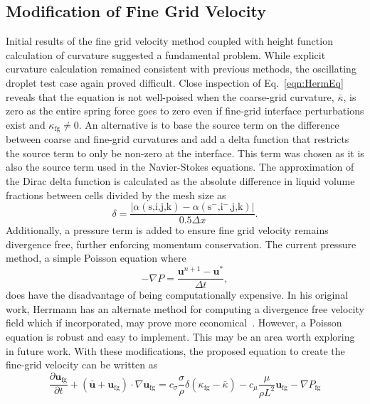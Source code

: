\subsection{Modification of Fine Grid Velocity}
Initial results of the fine grid velocity method coupled with height function calculation of curvature suggested a fundamental problem. While explicit curvature calculation remained consistent with previous methods, the oscillating droplet test case again proved difficult. Close inspection of Eq.~\ref{eqn:HermEq} reveals that the equation is not well-poised when the coarse-grid curvature, $\bar{\kappa}$, is zero as the entire spring force goes to zero even if fine-grid interface perturbations exist and $\kappa_{\text{fg}} \neq 0$.  An alternative is to base the source term on the difference between coarse and fine-grid curvatures and add a delta function that restricts the source term to only be non-zero at the interface. This term was chosen as it is also the source term used in the Navier-Stokes equations. The approximation of the Dirac delta function is calculated as the absolute difference in liquid volume fractions between cells divided by the mesh size as
\begin{equation}
\delta = \frac{|\alpha(\text{s,i,j,k}) - \alpha(\text{s$^-$,i$^-$,j,k}) | }{0.5 \Delta x}.
\label{eqn:delta}
\end{equation}
Additionally, a pressure term is added to ensure fine grid velocity remains divergence free, further enforcing momentum conservation. The current pressure method, a simple Poisson equation where 
\begin{equation}
-\nabla P = \frac{\bm{u}^{n+1} - \bm{u}^*}{\Delta t},
\label{eqn:poisson}
\end{equation}does have the disadvantage of being computationally expensive. In his original work, Herrmann has an alternate method for computing a divergence free velocity field which if incorporated, may prove more economical~\cite{Herrmann2013}. However, a Poisson equation is robust and easy to implement. This may be an area worth exploring in future work. With these modifications, the proposed equation to create the fine-grid velocity can be written as
\begin{equation}
\frac{\partial \bm{u}_{\text{fg}}}{\partial t} +
(\bar{\bm{u}}+\bm{u}_{\text{fg}}) \cdot \nabla \bm{u}_{\text{fg}} = 
c_{\sigma}\frac{\sigma}{\rho}\delta(\kappa_{\text{fg}}-\bar{\kappa})- 
c_{\mu}\frac{\mu}{\rho L^2}\bm{u}_{\text{fg}} -
\nabla P_{\text{fg}}
\label{eqn:MyEq}
\end{equation}
